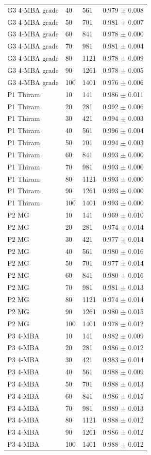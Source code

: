 {\begin{longtable}{L{4.0cm}L{2.4cm}L{2.4cm}L{4.2cm}}
G3 4-MBA grade & 40 & 561 & 0.979 $\pm$ 0.008 \\
G3 4-MBA grade & 50 & 701 & 0.981 $\pm$ 0.007 \\
G3 4-MBA grade & 60 & 841 & 0.978 $\pm$ 0.000 \\
G3 4-MBA grade & 70 & 981 & 0.981 $\pm$ 0.004 \\
G3 4-MBA grade & 80 & 1121 & 0.978 $\pm$ 0.009 \\
G3 4-MBA grade & 90 & 1261 & 0.978 $\pm$ 0.005 \\
G3 4-MBA grade & 100 & 1401 & 0.976 $\pm$ 0.006 \\
P1 Thiram & 10 & 141 & 0.986 $\pm$ 0.011 \\
P1 Thiram & 20 & 281 & 0.992 $\pm$ 0.006 \\
P1 Thiram & 30 & 421 & 0.994 $\pm$ 0.003 \\
P1 Thiram & 40 & 561 & 0.996 $\pm$ 0.004 \\
P1 Thiram & 50 & 701 & 0.994 $\pm$ 0.003 \\
P1 Thiram & 60 & 841 & 0.993 $\pm$ 0.000 \\
P1 Thiram & 70 & 981 & 0.993 $\pm$ 0.000 \\
P1 Thiram & 80 & 1121 & 0.993 $\pm$ 0.000 \\
P1 Thiram & 90 & 1261 & 0.993 $\pm$ 0.000 \\
P1 Thiram & 100 & 1401 & 0.993 $\pm$ 0.000 \\
P2 MG & 10 & 141 & 0.969 $\pm$ 0.010 \\
P2 MG & 20 & 281 & 0.974 $\pm$ 0.014 \\
P2 MG & 30 & 421 & 0.977 $\pm$ 0.014 \\
P2 MG & 40 & 561 & 0.980 $\pm$ 0.016 \\
P2 MG & 50 & 701 & 0.977 $\pm$ 0.014 \\
P2 MG & 60 & 841 & 0.980 $\pm$ 0.016 \\
P2 MG & 70 & 981 & 0.981 $\pm$ 0.013 \\
P2 MG & 80 & 1121 & 0.974 $\pm$ 0.014 \\
P2 MG & 90 & 1261 & 0.980 $\pm$ 0.015 \\
P2 MG & 100 & 1401 & 0.978 $\pm$ 0.012 \\
P3 4-MBA & 10 & 141 & 0.982 $\pm$ 0.009 \\
P3 4-MBA & 20 & 281 & 0.986 $\pm$ 0.012 \\
P3 4-MBA & 30 & 421 & 0.983 $\pm$ 0.014 \\
P3 4-MBA & 40 & 561 & 0.988 $\pm$ 0.009 \\
P3 4-MBA & 50 & 701 & 0.988 $\pm$ 0.013 \\
P3 4-MBA & 60 & 841 & 0.986 $\pm$ 0.015 \\
P3 4-MBA & 70 & 981 & 0.989 $\pm$ 0.013 \\
P3 4-MBA & 80 & 1121 & 0.988 $\pm$ 0.012 \\
P3 4-MBA & 90 & 1261 & 0.986 $\pm$ 0.012 \\
P3 4-MBA & 100 & 1401 & 0.988 $\pm$ 0.012 \\
\end{longtable}
}


